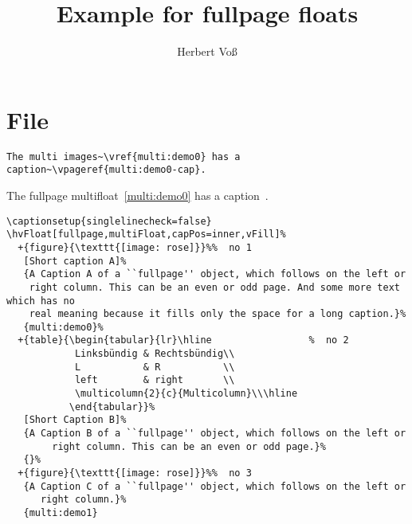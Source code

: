 \documentclass[twoside]{scrartcl}
\begin{document}
\title{Example for fullpage floats}
\author{Herbert Voß}
\maketitle

\tableofcontents

\twocolumn
\Blindtext

\section{File \texttt{\jobname}}

\begin{lstlisting}
The multi images~\vref{multi:demo0} has a caption~\vpageref{multi:demo0-cap}.
\end{lstlisting}

The fullpage multifloat~\vref{multi:demo0} has a caption~.


\begin{lstlisting}
\captionsetup{singlelinecheck=false}
\hvFloat[fullpage,multiFloat,capPos=inner,vFill]%
  +{figure}{\texttt{[image: rose]}}%%  no 1
   [Short caption A]%
   {A Caption A of a ``fullpage'' object, which follows on the left or
    right column. This can be an even or odd page. And some more text which has no
    real meaning because it fills only the space for a long caption.}%
   {multi:demo0}%
  +{table}{\begin{tabular}{lr}\hline                 %  no 2
            Linksbündig & Rechtsbündig\\
            L           & R           \\
            left        & right       \\
            \multicolumn{2}{c}{Multicolumn}\\\hline
           \end{tabular}}%
   [Short Caption B]%
   {A Caption B of a ``fullpage'' object, which follows on the left or
        right column. This can be an even or odd page.}%
   {}%
  +{figure}{\texttt{[image: rose]}}%%  no 3
   {A Caption C of a ``fullpage'' object, which follows on the left or
      right column.}%
   {multi:demo1}
\end{lstlisting}


\Float[Multi]
\end{document}
